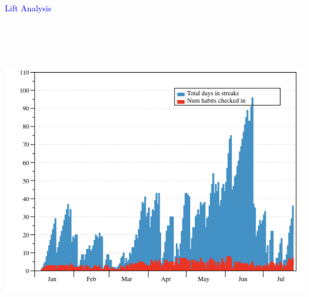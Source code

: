 \documentclass[landscape]{slides}
\begin{document}
\begin{slide}

    \textcolor{blue}{\Large{Lift Analysis}}

    \begin{center}
        \includegraphics[height=14cm]{lift-checkins-and-streaks}
    \end{center}

\end{slide}
\end{document}
